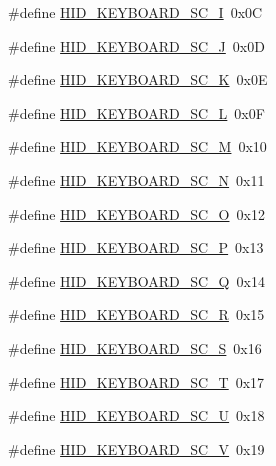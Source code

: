 \begin{DoxyCompactItemize}
\#define \hyperlink{group__Group__USBClassHIDCommon_gafa51d49cc5c2985e92de631eb8d39f89}{H\+I\+D\+\_\+\+K\+E\+Y\+B\+O\+A\+R\+D\+\_\+\+S\+C\+\_\+I}~0x0C
\item 
\#define \hyperlink{group__Group__USBClassHIDCommon_gaa24fdc6e3c19a6dbcff620197154cac5}{H\+I\+D\+\_\+\+K\+E\+Y\+B\+O\+A\+R\+D\+\_\+\+S\+C\+\_\+J}~0x0D
\item 
\#define \hyperlink{group__Group__USBClassHIDCommon_ga2f5cefb1eb39f64faebc083c5fa98f56}{H\+I\+D\+\_\+\+K\+E\+Y\+B\+O\+A\+R\+D\+\_\+\+S\+C\+\_\+K}~0x0E
\item 
\#define \hyperlink{group__Group__USBClassHIDCommon_ga419c979ea535b32e9b94bdc30709b78d}{H\+I\+D\+\_\+\+K\+E\+Y\+B\+O\+A\+R\+D\+\_\+\+S\+C\+\_\+L}~0x0F
\item 
\#define \hyperlink{group__Group__USBClassHIDCommon_gaebc82a58d6c62754d33eafa7b3cba917}{H\+I\+D\+\_\+\+K\+E\+Y\+B\+O\+A\+R\+D\+\_\+\+S\+C\+\_\+M}~0x10
\item 
\#define \hyperlink{group__Group__USBClassHIDCommon_gafa07eb5face0cf708c18a7f3eb71098b}{H\+I\+D\+\_\+\+K\+E\+Y\+B\+O\+A\+R\+D\+\_\+\+S\+C\+\_\+N}~0x11
\item 
\#define \hyperlink{group__Group__USBClassHIDCommon_ga56e215d7b16759ab7e33bb0251f1093f}{H\+I\+D\+\_\+\+K\+E\+Y\+B\+O\+A\+R\+D\+\_\+\+S\+C\+\_\+O}~0x12
\item 
\#define \hyperlink{group__Group__USBClassHIDCommon_gab5e6af7c067e77043e0760947810a825}{H\+I\+D\+\_\+\+K\+E\+Y\+B\+O\+A\+R\+D\+\_\+\+S\+C\+\_\+P}~0x13
\item 
\#define \hyperlink{group__Group__USBClassHIDCommon_gaa9260865e82f2f02fda5d234aac08885}{H\+I\+D\+\_\+\+K\+E\+Y\+B\+O\+A\+R\+D\+\_\+\+S\+C\+\_\+Q}~0x14
\item 
\#define \hyperlink{group__Group__USBClassHIDCommon_ga19c5ee1ece952942fb905c93c6283c73}{H\+I\+D\+\_\+\+K\+E\+Y\+B\+O\+A\+R\+D\+\_\+\+S\+C\+\_\+R}~0x15
\item 
\#define \hyperlink{group__Group__USBClassHIDCommon_gaa3c971164f0f41c8173539e36ee45228}{H\+I\+D\+\_\+\+K\+E\+Y\+B\+O\+A\+R\+D\+\_\+\+S\+C\+\_\+S}~0x16
\item 
\#define \hyperlink{group__Group__USBClassHIDCommon_ga3b520d8040a60fd92a3a217919a83a17}{H\+I\+D\+\_\+\+K\+E\+Y\+B\+O\+A\+R\+D\+\_\+\+S\+C\+\_\+T}~0x17
\item 
\#define \hyperlink{group__Group__USBClassHIDCommon_gafad9df554e3c225546b6d19324e39670}{H\+I\+D\+\_\+\+K\+E\+Y\+B\+O\+A\+R\+D\+\_\+\+S\+C\+\_\+U}~0x18
\item 
\#define \hyperlink{group__Group__USBClassHIDCommon_ga73b00177a27e28523c13bc5ad4f8d473}{H\+I\+D\+\_\+\+K\+E\+Y\+B\+O\+A\+R\+D\+\_\+\+S\+C\+\_\+V}~0x19

\end{DoxyCompactItemize}
